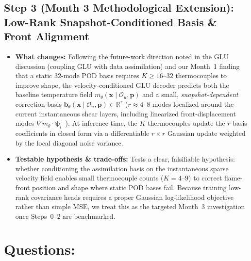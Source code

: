 \documentclass[11pt,letterpaper]{article}
\begin{document}
\subsection*{Step 3 (Month 3 Methodological Extension): Low-Rank Snapshot-Conditioned Basis \& Front Alignment}
\begin{itemize}
    \item \textbf{What changes:} Following the future-work direction noted in the GLU discussion (coupling GLU with data assimilation) and our Month~1 finding that a static 32-mode POD basis requires $K \ge 16\text{--}32$ thermocouples to improve shape, the velocity-conditioned GLU decoder predicts both the baseline temperature field $m_\theta(\mathbf{x} \mid \mathcal{O}_u, \mathbf{p})$ and a small, \emph{snapshot-dependent} correction basis $\mathbf{b}_\theta(\mathbf{x} \mid \mathcal{O}_u, \mathbf{p}) \in \mathbb{R}^r$ ($r \approx 4\text{--}8$ modes localized around the current instantaneous shear layers, including linearized front-displacement modes $\nabla m_\theta \cdot \boldsymbol{\psi}_i$~\cite{ravela2007field}). At inference time, the $K$ thermocouples update the $r$ basis coefficients in closed form via a differentiable $r \times r$ Gaussian update weighted by the local diagonal noise variance.
    \item \textbf{Testable hypothesis \& trade-offs:} Tests a clear, falsifiable hypothesis: whether conditioning the assimilation basis on the instantaneous sparse velocity field enables small thermocouple counts ($K = 4\text{--}9$) to correct flame-front position and shape where static POD bases fail. Because training low-rank covariance heads requires a proper Gaussian log-likelihood objective rather than simple MSE, we treat this as the targeted Month~3 investigation once Steps~0--2 are benchmarked.
\end{itemize}

\section{Questions:}
\end{document}
